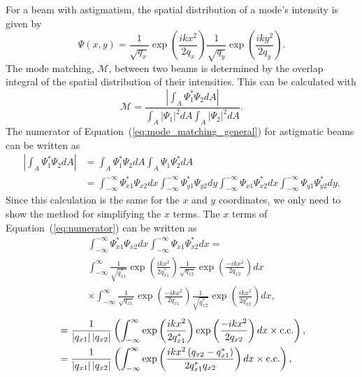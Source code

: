 For a beam with astigmatism, the spatial distribution of a mode's intensity is given by 
\begin{equation}
\Psi(x,y) = \frac{1}{\sqrt{q_x}}\exp\left(\frac{ikx^2}{2q_x}\right)\frac{1}{\sqrt{q_y}}\exp\left(\frac{iky^2}{2q_y}\right).
\end{equation}
The mode matching, $\mathcal{M}$, between two beams is determined by the overlap integral of the spatial distribution of their intensities. This can be calculated with
\begin{equation}
\mathcal{M} = \frac{\left|\int_{A} \Psi_1^*\Psi_2 dA \right|}{\int_{A} \left|\Psi_1 \right|^2 dA \int_{A} \left|\Psi_2 \right|^2 dA}.
\label{eq:mode_matching_general}
\end{equation}
The numerator of Equation~(\ref{eq:mode_matching_general}) for astigmatic beams can be written as
\begin{align}
\left|\int_{A} \Psi_1^*\Psi_2 dA \right| &= \int_{A} \Psi_1^*\Psi_2 dA\int_{A} \Psi_1\Psi_2^* dA \\
&= \int^{-\infty}_{-\infty} \Psi_{x1}^*\Psi_{x2} dx \int^{-\infty}_{-\infty} \Psi_{y1}^*\Psi_{y2} dy \int^{-\infty}_{-\infty} \Psi_{x1}\Psi_{x2}^* dx \int^{-\infty}_{-\infty} \Psi_{y1}\Psi_{y2}^* dy.
\label{eq:numerator}
\end{align}
Since this calculation is the same for the $x$ and $y$ coordinates, we only need to show the method for simplifying the $x$ terms. The $x$ terms of Equation~(\ref{eq:numerator}) can be written as
\begin{multline}
\int^{-\infty}_{-\infty} \Psi_{x1}^*\Psi_{x2} dx \int^{-\infty}_{-\infty} \Psi_{x1}\Psi_{x2}^* dx = \\ \int_{-\infty}^{\infty} \frac{1}{\sqrt{q_{x1}^*}}\exp\left(\frac{ikx^2}{2q_{x1}^*}\right)\frac{1}{\sqrt{q_{x2}}}\exp\left(\frac{-ikx^2}{2q_{x2}}\right)dx \\
\times\int_{-\infty}^{\infty} \frac{1}{\sqrt{q_{x1}}}\exp\left(\frac{-ikx^2}{2q_{x1}}\right)\frac{1}{\sqrt{q_{x2}^*}}\exp\left(\frac{ikx^2}{2q_{x2}^*}\right)dx,
\end{multline}
\begin{align}
&=\frac{1}{\left|q_{x1}\right|\left|q_{x2}\right|}\left(\int_{-\infty}^{\infty}\exp\left(\frac{ikx^2}{2q_{x1}^*}\right)\exp\left(\frac{-ikx^2}{2q_{x2}}\right)dx \times \rm{c.c.} \right) , \nonumber\\
&=\frac{1}{\left|q_{x1}\right|\left|q_{x2}\right|}\left( \int_{-\infty}^{\infty} \exp\left(\frac{ikx^2\left(q_{x2} - q_{x1}^*\right)}{2q_{x1}^*q_{x2}}\right) dx \times \rm{c.c.}\right),
\label{eq:numerator_x_coords}
\end{align}
